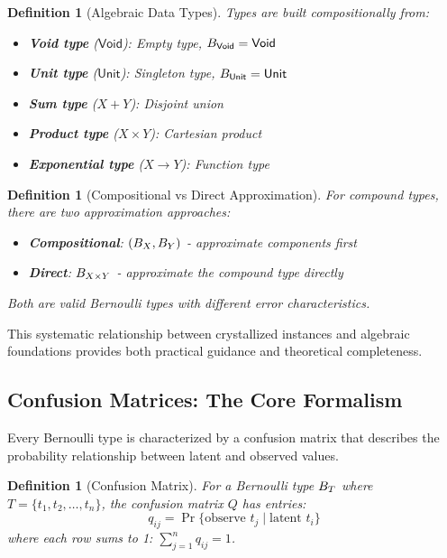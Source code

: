 \documentclass[11pt,final,hidelinks]{article}
\newtheorem{definition}[theorem]{Definition}
\newcommand{\voidtype}{\mathsf{Void}}
\newcommand{\unittype}{\mathsf{Unit}}
\begin{document}
\begin{definition}[Algebraic Data Types]
Types are built compositionally from:
\begin{itemize}
    \item \textbf{Void type} ($\voidtype$): Empty type, $\BType{\voidtype} = \voidtype$
    \item \textbf{Unit type} ($\unittype$): Singleton type, $\BType{\unittype} = \unittype$ 
    \item \textbf{Sum type} ($X + Y$): Disjoint union
    \item \textbf{Product type} ($X \times Y$): Cartesian product  
    \item \textbf{Exponential type} ($X \to Y$): Function type
\end{itemize}
\end{definition}

\begin{definition}[Compositional vs Direct Approximation]
For compound types, there are two approximation approaches:
\begin{itemize}
    \item \textbf{Compositional}: $(B_{X}, B_{Y})$ - approximate components first
    \item \textbf{Direct}: $B_{X \times Y}$ - approximate the compound type directly
\end{itemize}
Both are valid Bernoulli types with different error characteristics.
\end{definition}

This systematic relationship between crystallized instances and algebraic foundations provides both practical guidance and theoretical completeness.

\subsection{Confusion Matrices: The Core Formalism}

Every Bernoulli type is characterized by a confusion matrix that describes the probability relationship between latent and observed values.

\begin{definition}[Confusion Matrix]
For a Bernoulli type $B_{T}$ where $T = \{t_1, t_2, \ldots, t_n\}$, the confusion matrix $Q$ has entries:
$$q_{ij} = \Pr\{\text{observe } t_j \mid \text{latent } t_i\}$$
where each row sums to 1: $\sum_{j=1}^n q_{ij} = 1$.
\end{definition}
\end{document}

